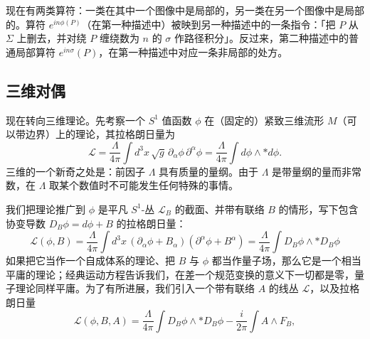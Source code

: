 
现在有两类算符：一类在其中一个图像中是局部的，另一类在另一个图像中是局部的。算符 $e^{in\phi(P)}$（在第一种描述中）被映到另一种描述中的一条指令：「把 $P$ 从 $\Sigma$ 上删去，并对绕 $P$ 缠绕数为 $n$ 的 $\sigma$ 作路径积分」。反过来，第二种描述中的普通局部算符 $e^{in\sigma}(P)$，在第一种描述中对应一条非局部的处方。

\subsection{三维对偶}

现在转向三维理论。先考察一个 $S^1$ 值函数 $\phi$ 在（固定的）紧致三维流形 $M$（可以带边界）上的理论，其拉格朗日量为
\begin{equation}
  \tag{8.27}
  \label{eq:8-27}
  \mathcal{L}=\frac{\Lambda}{4\pi}\int d^3x\,\sqrt{g}\,\partial_\alpha\phi\,\partial^\alpha\phi
  =\frac{\Lambda}{4\pi}\int d\phi\wedge\ast d\phi .
\end{equation}
三维的一个新奇之处是：前因子 $\Lambda$ 具有质量的量纲。由于 $\Lambda$ 是带量纲的量而非常数，在 $\Lambda$ 取某个数值时不可能发生任何特殊的事情。

我们把理论推广到 $\phi$ 是平凡 $S^1$-丛 $\mathcal{L}_B$ 的截面、并带有联络 $B$ 的情形，写下包含协变导数 $D_B\phi=d\phi+B$ 的拉格朗日量：
\begin{equation}
  \tag{8.28}
  \label{eq:8-28}
  \mathcal{L}(\phi,B)=\frac{\Lambda}{4\pi}\int d^3x\,(\partial_\alpha\phi+B_\alpha)(\partial^\alpha\phi+B^\alpha)
  =\frac{\Lambda}{4\pi}\int D_B\phi\wedge\ast D_B\phi
\end{equation}
如果把它当作一个自成体系的理论、把 $B$ 与 $\phi$ 都当作量子场，那么它是一个相当平庸的理论；经典运动方程告诉我们，在差一个规范变换的意义下一切都是零，量子理论同样平庸。为了有所进展，我们引入一个带有联络 $A$ 的线丛 $\mathcal{L}$，以及拉格朗日量
\begin{equation}
  \tag{8.29}
  \label{eq:8-29}
  \mathcal{L}(\phi,B,A)=\frac{\Lambda}{4\pi}\int D_B\phi\wedge\ast D_B\phi-\frac{i}{2\pi}\int A\wedge F_B,
\end{equation}

